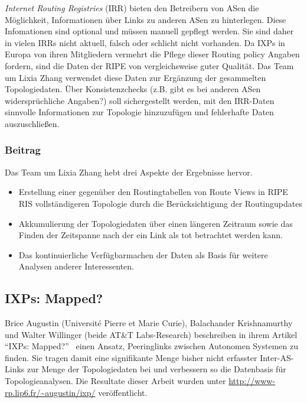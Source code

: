 \emph{Internet Routing Registries} (IRR) bieten den Betreibern von ASen die Möglichkeit, Informationen über Links zu anderen ASen zu hinterlegen.
Diese Infomationen sind optional und müssen manuell gepflegt werden.
Sie sind daher in vielen IRRs nicht aktuell, falsch oder schlicht nicht vorhanden.
Da IXPs in Europa von ihren Mitgliedern vermehrt die Pflege dieser Routing policy Angaben fordern, sind die Daten der RIPE von vergleichsweise guter Qualität.
Das Team um Lixia Zhang verwendet diese Daten zur Ergänzung der gesammelten Topologiedaten.
Über Konsistenzchecks (z.B. gibt es bei anderen ASen widersprüchliche Angaben?) soll sichergestellt werden, mit den IRR-Daten sinnvolle Informationen zur Topologie hinzuzufügen und fehlerhafte Daten auszuschließen.

\subsubsection{Beitrag}
Das Team um Lixia Zhang hebt drei Aspekte der Ergebnisse hervor.
\begin{itemize}
  \item Erstellung einer gegenüber den Routingtabellen von Route Views in RIPE RIS vollständigeren Topologie durch die Berücksichtigung der Routingupdates
  \item Akkumulierung der Topologiedaten über einen längeren Zeitraum sowie das Finden der Zeitspanne nach der ein Link als tot betrachtet werden kann.
  \item Das kontinuierliche Verfügbarmachen der Daten als Basis für weitere Analysen anderer Interessenten.
\end{itemize}

\subsection{IXPs: Mapped?}\label{subsec:ixps}

Brice Augustin (Université Pierre et Marie Curie), Balachander Krishnamurthy  und Walter Willinger (beide AT\&T Labs-Research) beschreiben in ihrem Artikel "`IXPs: Mapped?"'~\cite{Augustin:2009:IM:1644893.1644934} einen Ansatz, Peeringlinks zwischen Autonomen Systemen zu finden.
Sie tragen damit eine signifikante Menge bisher nicht erfasster Inter-AS-Links zur Menge der Topologiedaten bei und verbessern so die Datenbasis für Topologieanalysen.
Die Resultate dieser Arbeit wurden unter \url{http://www-rp.lip6.fr/~augustin/ixp/} veröffentlicht.

